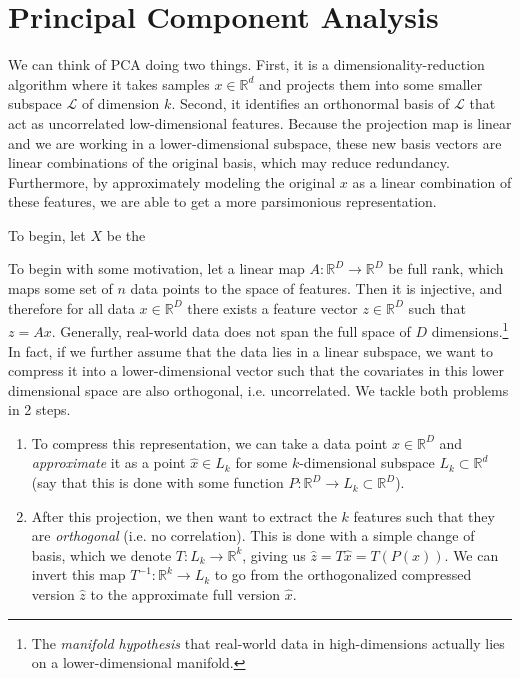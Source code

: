 \section{Principal Component Analysis} 
  
  We can think of PCA doing two things. First, it is a dimensionality-reduction algorithm where it takes samples $x \in \mathbb{R}^d$ and projects them into some smaller subspace $\mathcal{L}$ of dimension $k$. Second, it identifies an orthonormal basis of $\mathcal{L}$ that act as uncorrelated low-dimensional features. Because the projection map is linear and we are working in a lower-dimensional subspace, these new basis vectors are linear combinations of the original basis, which may reduce redundancy. Furthermore, by approximately modeling the original $x$ as a linear combination of these features, we are able to get a more parsimonious representation. 

  To begin, let $X$ be the 

  To begin with some motivation, let a linear map $A: \mathbb{R}^D \rightarrow \mathbb{R}^D$ be full rank, which maps some set of $n$ data points to the space of features. Then it is injective, and therefore for all data $x \in \mathbb{R}^D$ there exists a feature vector $z \in \mathbb{R}^D$ such that $z = Ax$. Generally, real-world data does not span the full space of $D$ dimensions.\footnote{The \textit{manifold hypothesis} that real-world data in high-dimensions actually lies on a lower-dimensional manifold. } In fact, if we further assume that the data lies in a linear subspace, we want to compress it into a lower-dimensional vector such that the covariates in this lower dimensional space are also orthogonal, i.e. uncorrelated. We tackle both problems in 2 steps. 
  \begin{enumerate}
    \item To compress this representation, we can take a data point $x \in \mathbb{R}^D$ and \textit{approximate} it as a point $\hat{x} \in L_k$ for some $k$-dimensional subspace $L_k \subset \mathbb{R}^d$ (say that this is done with some function $P: \mathbb{R}^D \rightarrow L_k \subset \mathbb{R}^D$). 
    \item After this projection, we then want to extract the $k$ features such that they are \textit{orthogonal} (i.e. no correlation). This is done with a simple change of basis, which we denote $T: L_k \rightarrow \mathbb{R}^k$, giving us $\hat{z} = T \hat{x} = T (P(x))$. We can invert this map $T^{-1} : \mathbb{R}^k \rightarrow L_k$ to go from the orthogonalized compressed version $\hat{z}$ to the approximate full version $\hat{x}$.
  \end{enumerate}

